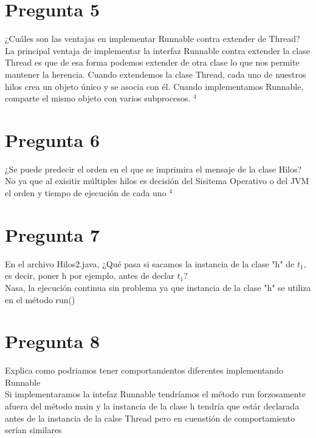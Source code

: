 \documentclass{article}
\begin{document}
    \section*{Pregunta 5}
    \Large 
    ¿Cuáles son las ventajas en implementar Runnable contra extender de Thread?\\
    \normalsize
    La principal ventaja de implementar la interfaz Runnable contra extender la clase Thread es que de esa forma podemos extender de otra clase lo que nos permite mantener la herencia. Cuando extendemos la clase Thread, cada uno de nuestros hilos crea un objeto único y se asocia con él. Cuando implementamos Runnable, comparte el mismo objeto con varios subprocesos. $^4$
    
    \section*{Pregunta 6}
    \Large 
    ¿Se puede predecir el orden en el que se imprimira el mensaje de la clase Hilos?\\
    \normalsize
    No ya que al exisitir múltiples hilos es decisión del Sisitema Operativo o del JVM el orden y tiempo de ejecución de cada uno $^4$
    
    \section*{Pregunta 7}
    \Large 
    En el archivo Hilos2.java, ¿Qué pasa si sacamos la instancia de la clase "h" de $t_1$, es decir, poner h por ejemplo, antes de declar $t_1$?\\
    \normalsize
    Nasa, la ejecución continua sin problema ya que instancia de la clase "h" se utiliza en el método run() 
    
    \section*{Pregunta 8}
    \Large 
    Explica como podriamos tener comportamientos diferentes implementando Runnable\\
    \normalsize
    Si implementaramos la intefaz Runnable tendríamos el método run forzosamente afuera del método main y la instancia de la clase h tendría que estár declarada antes de la instancia de la calse Thread pero en cuenstión de comportamiento serían similares
    
\end{document}
